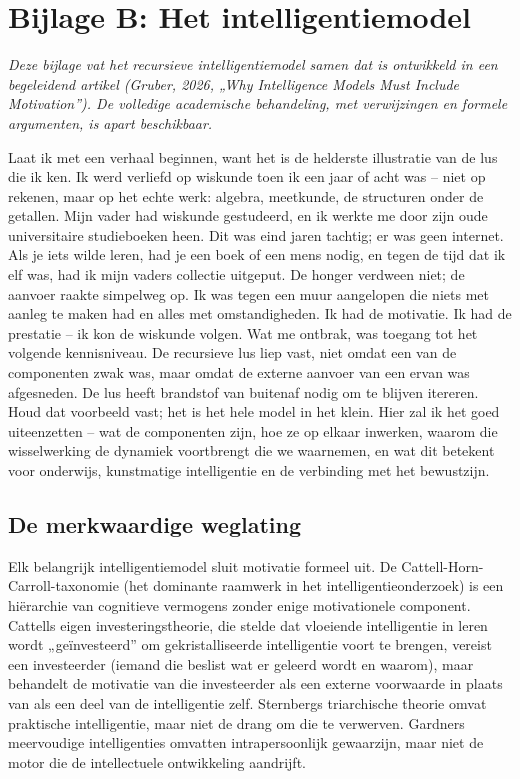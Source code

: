 \documentclass[11pt, twoside, openright]{book}
\begin{document}
\chapter*{Bijlage B: Het intelligentiemodel}

\textit{Deze bijlage vat het recursieve intelligentiemodel samen dat is ontwikkeld in een begeleidend artikel (Gruber, 2026, „Why Intelligence Models Must Include Motivation”). De volledige academische behandeling, met verwijzingen en formele argumenten, is apart beschikbaar.}

Laat ik met een verhaal beginnen, want het is de helderste illustratie van de lus die ik ken. Ik werd verliefd op wiskunde toen ik een jaar of acht was -- niet op rekenen, maar op het echte werk: algebra, meetkunde, de structuren onder de getallen. Mijn vader had wiskunde gestudeerd, en ik werkte me door zijn oude universitaire studieboeken heen. Dit was eind jaren tachtig; er was geen internet. Als je iets wilde leren, had je een boek of een mens nodig, en tegen de tijd dat ik elf was, had ik mijn vaders collectie uitgeput. De honger verdween niet; de aanvoer raakte simpelweg op. Ik was tegen een muur aangelopen die niets met aanleg te maken had en alles met omstandigheden. Ik had de motivatie. Ik had de prestatie -- ik kon de wiskunde volgen. Wat me ontbrak, was toegang tot het volgende kennisniveau. De recursieve lus liep vast, niet omdat een van de componenten zwak was, maar omdat de externe aanvoer van een ervan was afgesneden. De lus heeft brandstof van buitenaf nodig om te blijven itereren. Houd dat voorbeeld vast; het is het hele model in het klein. Hier zal ik het goed uiteenzetten -- wat de componenten zijn, hoe ze op elkaar inwerken, waarom die wisselwerking de dynamiek voortbrengt die we waarnemen, en wat dit betekent voor onderwijs, kunstmatige intelligentie en de verbinding met het bewustzijn.

\section*{De merkwaardige weglating}

Elk belangrijk intelligentiemodel sluit motivatie formeel uit. De Cattell-Horn-Carroll-taxonomie (het dominante raamwerk in het intelligentieonderzoek) is een hiërarchie van cognitieve vermogens zonder enige motivationele component. Cattells eigen investeringstheorie, die stelde dat vloeiende intelligentie in leren wordt „geïnvesteerd” om gekristalliseerde intelligentie voort te brengen, vereist een investeerder (iemand die beslist wat er geleerd wordt en waarom), maar behandelt de motivatie van die investeerder als een externe voorwaarde in plaats van als een deel van de intelligentie zelf. Sternbergs triarchische theorie omvat praktische intelligentie, maar niet de drang om die te verwerven. Gardners meervoudige intelligenties omvatten intrapersoonlijk gewaarzijn, maar niet de motor die de intellectuele ontwikkeling aandrijft.
\end{document}
